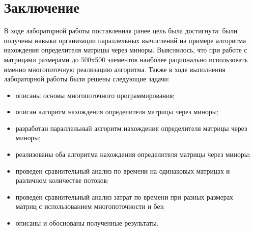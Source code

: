 
\chapter*{Заключение}

В ходе лабораторной работы поставленная ранее цель была достигнута: были получены навыки организации параллельных вычислений на примере алгоритма нахождения определителя матрицы через миноры. Выяснилось, что при работе с матрицами размерами до 500x500 элементов наиболее рационально использовать именно многопоточную реализацию алгоритма. Также в ходе выполнения лабораторной работы были решены следующие задачи:

\begin{itemize}[label=---]
	\item описаны основы многопоточного программирования;
    \item описан алгоритм нахождения определителя матрицы через миноры;
    \item разработан параллельный алгоритм нахождения определителя матрицы через миноры;
    \item реализованы оба алгоритма нахождения определителя матрицы через миноры;
    \item проведен сравнительный анализ по времени на одинаковых матрицах и различном количестве потоков;
    \item проведен сравнительный анализ затрат по времени при разных размерах матриц с использованием многопоточности и без;
	\item описаны и обоснованы полученные результаты.
\end{itemize}